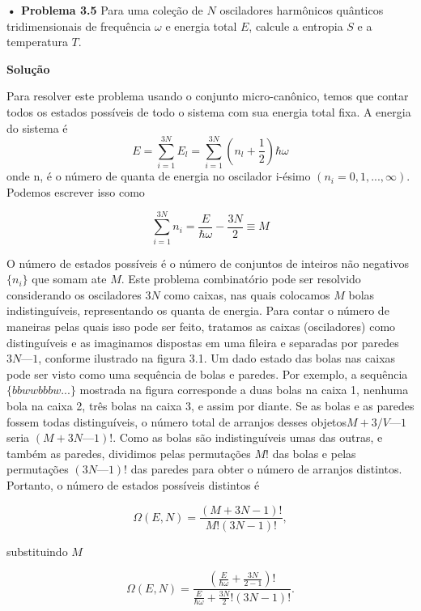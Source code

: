 \documentclass[12pt]{article}
\begin{document}
\textbf{• Problema 3.5} Para uma coleção de $N$ osciladores harmônicos quânticos tridimensionais de frequência $\omega$ e energia total $E$, calcule a entropia $S$ e a temperatura $T$.

\textbf{Solução}

Para resolver este problema usando o conjunto micro-canônico, temos que contar todos os estados possíveis de todo o sistema com sua energia total fixa. A energia do sistema é
\begin{equation}
E = \sum^{3N}_{i=1} E_{l} = \sum^{3N}_{i=1} \left(n_{l}+\frac{1}{2} \right) \hbar \omega
\end{equation}
onde n, é o número de quanta de energia no oscilador i-ésimo $(n_{i} = 0,1, ... ,\infty)$. Podemos escrever isso como

\begin{equation}
\sum^{3N}_{i=1} n_{i} = \frac{E}{\hbar \omega} - \frac{3N}{2} \equiv M
\end{equation}

O número de estados possíveis é o número de conjuntos de inteiros não negativos $\{n_{i} \}$ que somam ate $M$. Este problema combinatório pode ser resolvido considerando os osciladores $3N$ como caixas, nas quais colocamos $M$ bolas indistinguíveis, representando os quanta de energia. Para contar o número de maneiras pelas quais isso pode ser feito, tratamos as caixas (osciladores) como distinguíveis e as imaginamos dispostas em uma fileira e separadas por paredes $3N — 1$, conforme ilustrado na figura 3.1. Um dado estado das bolas nas caixas pode ser visto como uma sequência de bolas e paredes. Por exemplo, a sequência $\{ bbwwbbbw... \}$ mostrada na figura corresponde a duas bolas na caixa 1, nenhuma bola na caixa 2, três bolas na caixa 3, e assim por diante. Se as bolas e as paredes fossem todas distinguíveis, o número total de arranjos desses objetos$ M + 3/V — 1$ seria $(M + 3N — 1)!$. Como as bolas são indistinguíveis umas das outras, e também as paredes, dividimos pelas permutações $M!$ das bolas e pelas permutações $(3N — 1)!$ das paredes para obter o número de arranjos distintos. Portanto, o número de estados possíveis distintos é

\begin{equation}
    \Omega(E,N) = \frac{(M+3N-1)!}{M!(3N-1)!}  ,
\end{equation}

substituindo  $M$

\begin{equation}
    \Omega(E,N) = \frac{(\frac{E}{\hbar \omega} + \frac{3N}{2-1})!}{\frac{E}{\hbar \omega} + \frac{3N}{2}!(3N-1)!}.
\end{equation}
\end{document}
